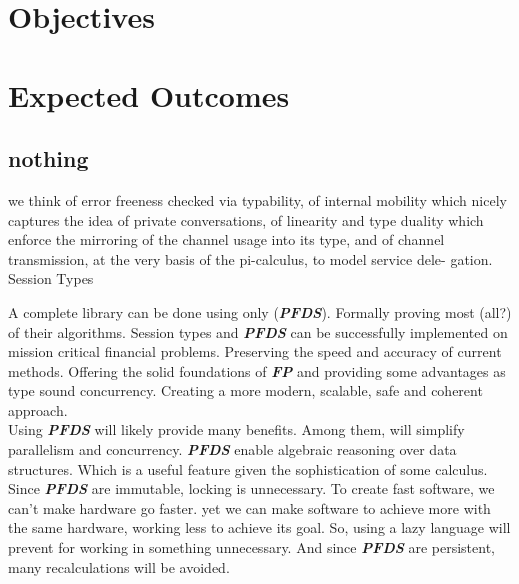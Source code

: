 \documentclass{tufte-book} %
\newcommand{\pfds}{\textbf{\textit{PFDS}}\xspace}
\newcommand{\fp}{\textbf{\textit{FP}}\xspace}
\begin{document}
\chapter{Objectives}



\chapter{Expected Outcomes}


\newpage
\section{nothing}
we think of error freeness checked via typability, of internal mobility
which nicely captures the idea of private conversations, of linearity and type
duality which enforce the mirroring of the channel usage into its type, and of
channel transmission, at the very basis of the pi-calculus, to model service dele-
gation.
Session Types 

A complete library can be done using only (\pfds). Formally proving most (all?) of their algorithms. Session types and \pfds can be successfully implemented on mission critical financial problems. Preserving the speed and accuracy of current methods. Offering the solid foundations of \fp and providing some advantages as type sound concurrency. Creating a more modern, scalable, safe and coherent approach.\\

Using \pfds will likely provide many benefits. Among them, will simplify parallelism  and concurrency. \pfds enable algebraic reasoning over data structures. Which is a useful feature given the sophistication of some calculus. Since \pfds are immutable, locking is unnecessary.  To create fast software, we can't make hardware go faster. yet we can make software to achieve more with the same hardware, working less to achieve its goal. So, using a lazy language will prevent for working in something unnecessary. And since \pfds are persistent, many recalculations will be avoided.  \\


\backmatter




\end{document}
